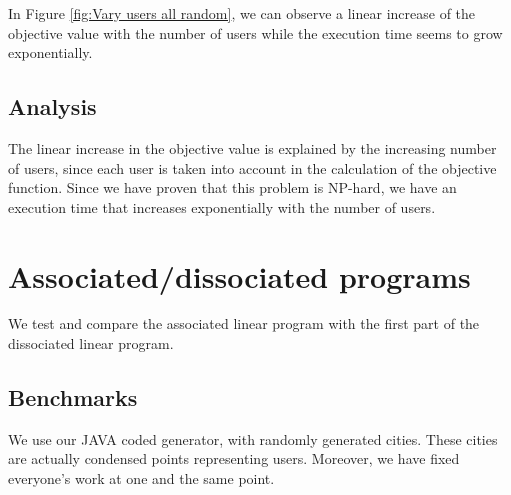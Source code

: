 \documentclass[12pt, a4paper, twoside]{memoir}
\begin{document}
{	In Figure \ref{fig:Vary users all random}, we can observe a linear increase of the objective value with the number of users while the execution time seems to grow exponentially.
	
	\subsection{Analysis}
	The linear increase in the objective value is explained by the increasing number of users, since each user is taken into account in the calculation of the objective function. Since we have proven that this problem is NP-hard, we have an execution time that increases exponentially with the number of users. 
	
	\section{Associated/dissociated programs}
	
	We test and compare the associated linear program with the first part of the dissociated linear program.
	
	\subsection{Benchmarks}
	We use our JAVA coded generator, with randomly generated cities. These cities are actually condensed points representing users. Moreover, we have fixed everyone's work at one and the same point.
	
}
\end{document}
